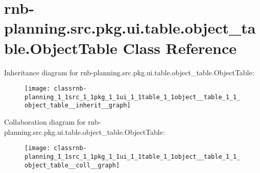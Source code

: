 \hypertarget{classrnb-planning_1_1src_1_1pkg_1_1ui_1_1table_1_1object__table_1_1_object_table}{}\section{rnb-\/planning.src.\+pkg.\+ui.\+table.\+object\+\_\+table.\+Object\+Table Class Reference}
\label{classrnb-planning_1_1src_1_1pkg_1_1ui_1_1table_1_1object__table_1_1_object_table}


Inheritance diagram for rnb-\/planning.src.\+pkg.\+ui.\+table.\+object\+\_\+table.\+Object\+Table\+:\nopagebreak
\begin{figure}[H]
\begin{center}
\leavevmode
\texttt{[image: classrnb-planning\_1\_1src\_1\_1pkg\_1\_1ui\_1\_1table\_1\_1object\_\_table\_1\_1\_object\_table\_\_inherit\_\_graph]}
\end{center}
\end{figure}


Collaboration diagram for rnb-\/planning.src.\+pkg.\+ui.\+table.\+object\+\_\+table.\+Object\+Table\+:\nopagebreak
\begin{figure}[H]
\begin{center}
\leavevmode
\texttt{[image: classrnb-planning\_1\_1src\_1\_1pkg\_1\_1ui\_1\_1table\_1\_1object\_\_table\_1\_1\_object\_table\_\_coll\_\_graph]}
\end{center}
\end{figure}
